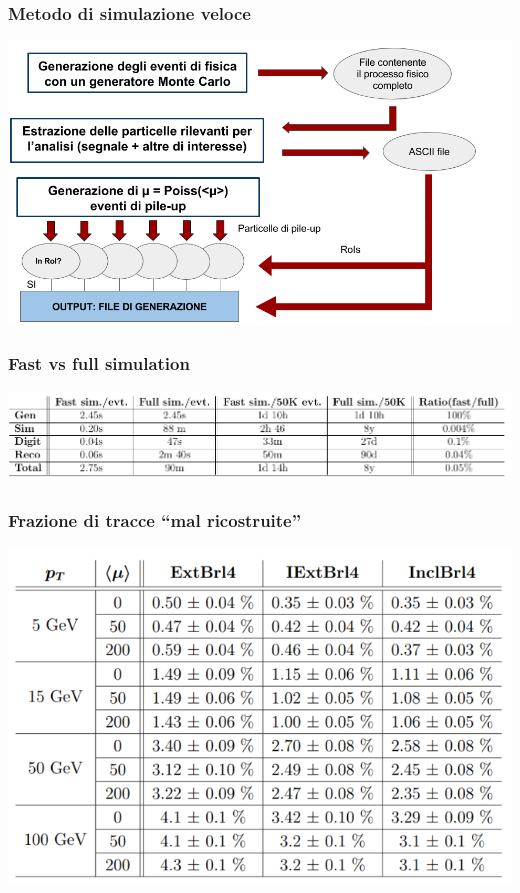 \documentclass{beamer}
\begin{document}
\begin{frame}[t]
\frametitle{Metodo di simulazione veloce}
\includegraphics[width=\textwidth]{PhysicsGenerationFlowIT4}

\end{frame}


\begin{frame}
\frametitle{Fast vs full simulation}
\includegraphics[width=\textwidth]{time}
\end{frame}


\begin{frame}
\frametitle{Frazione di tracce ``mal ricostruite''}
\includegraphics[width=.9\textwidth]{fake_tab}
\end{frame}
\end{document}
